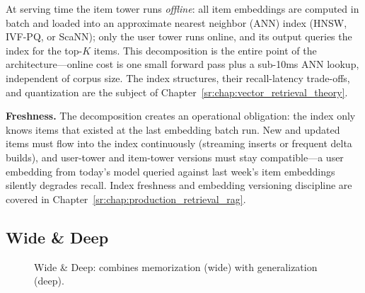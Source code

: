 At serving time the item tower runs \textit{offline}: all item embeddings are computed in batch and loaded into an approximate nearest neighbor (ANN) index (HNSW, IVF-PQ, or ScaNN); only the user tower runs online, and its output queries the index for the top-$K$ items. This decomposition is the entire point of the architecture---online cost is one small forward pass plus a sub-10ms ANN lookup, independent of corpus size. The index structures, their recall-latency trade-offs, and quantization are the subject of Chapter~\ref{sr:chap:vector_retrieval_theory}.

\textbf{Freshness.} The decomposition creates an operational obligation: the index only knows items that existed at the last embedding batch run. New and updated items must flow into the index continuously (streaming inserts or frequent delta builds), and user-tower and item-tower versions must stay compatible---a user embedding from today's model queried against last week's item embeddings silently degrades recall. Index freshness and embedding versioning discipline are covered in Chapter~\ref{sr:chap:production_retrieval_rag}.

\subsection{Wide \& Deep}

\begin{figure}[H]
\centering
{}
\caption{Wide \& Deep: combines memorization (wide) with generalization (deep).}
\end{figure}

